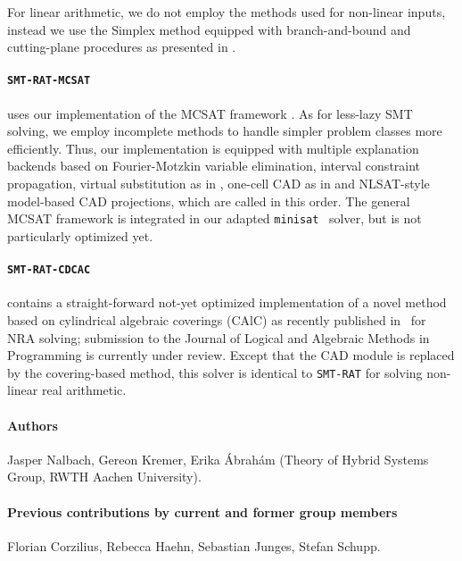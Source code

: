 \documentclass{article}
\begin{document}
For linear arithmetic, we do not employ the methods used for non-linear inputs, instead we use the Simplex method equipped with branch-and-bound and cutting-plane procedures as presented in \cite{DM06}.


\paragraph{\texttt{SMT-RAT-MCSAT}} uses our implementation of the MCSAT framework \cite{Moura2013}.
As for less-lazy SMT solving, we employ incomplete methods to handle simpler problem classes more efficiently. Thus, our implementation is equipped with multiple explanation backends based on Fourier-Motzkin variable elimination, interval constraint propagation, virtual substitution as in \cite{Abraham2017}, one-cell CAD as in \cite{Neuss2018} and NLSAT-style model-based CAD projections, which are called in this order. The general MCSAT framework is integrated in our adapted \texttt{minisat}~\cite{Een2003} solver, but is not particularly optimized yet.

\paragraph{\texttt{SMT-RAT-CDCAC}} contains a straight-forward not-yet optimized implementation of a novel method based on cylindrical algebraic coverings (CAlC) as recently published in~\cite{Abraham2020} for NRA solving; submission to the Journal of Logical and Algebraic Methods in Programming is currently under review. Except that the CAD module is replaced by the covering-based method, this solver is identical to \texttt{SMT-RAT} for solving non-linear real arithmetic.

\newpage

\paragraph{Authors}
Jasper Nalbach, Gereon Kremer, Erika \'Abrah\'am
(Theory of Hybrid Systems Group, RWTH Aachen University).

\paragraph{Previous contributions by current and former group members}
Florian Corzilius,
Rebecca Haehn,
Sebastian Junges,
Stefan Schupp.




\end{document}
